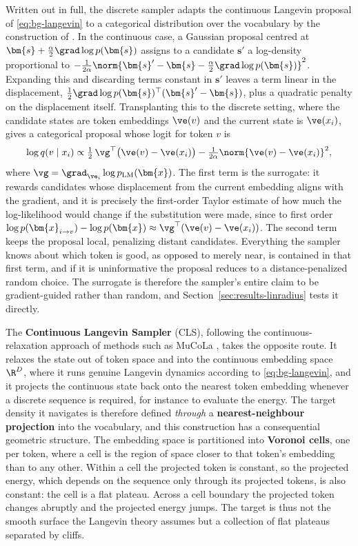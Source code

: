 Written out in full, the discrete sampler adapts the continuous Langevin proposal of \eqref{eq:bg-langevin} to a categorical distribution over the vocabulary by the construction of \citet{zhang2022langevin}. In the continuous case, a Gaussian proposal centred at $\bm{s} + \tfrac{\alpha}{2}\grad\log p(\bm{s})$ assigns to a candidate $\bm{s}'$ a log-density proportional to $-\tfrac{1}{2\alpha}\norm{\bm{s}' - \bm{s} - \tfrac{\alpha}{2}\grad\log p(\bm{s})}^2$. Expanding this and discarding terms constant in $\bm{s}'$ leaves a term linear in the displacement, $\tfrac{1}{2}\grad\log p(\bm{s})^\top(\bm{s}' - \bm{s})$, plus a quadratic penalty on the displacement itself. Transplanting this to the discrete setting, where the candidate states are token embeddings $\ve(v)$ and the current state is $\ve(x_i)$, gives a categorical proposal whose logit for token $v$ is
\begin{equation}
    \log q(v \mid x_i) \propto \tfrac{1}{2}\,\vg^\top\bigl(\ve(v) - \ve(x_i)\bigr) - \tfrac{1}{2\alpha}\norm{\ve(v) - \ve(x_i)}^2,
    \label{eq:bg-discrete-proposal}
\end{equation}
where $\vg = \grad_{\ve_i}\log p_{\text{LM}}(\bm{x})$. The first term is the surrogate: it rewards candidates whose displacement from the current embedding aligns with the gradient, and it is precisely the first-order Taylor estimate of how much the log-likelihood would change if the substitution were made, since to first order $\log p(\bm{x}_{i \to v}) - \log p(\bm{x}) \approx \vg^\top(\ve(v) - \ve(x_i))$. The second term keeps the proposal local, penalizing distant candidates. Everything the sampler knows about which token is good, as opposed to merely near, is contained in that first term, and if it is uninformative the proposal reduces to a distance-penalized random choice. The surrogate is therefore the sampler's entire claim to be gradient-guided rather than random, and Section~\ref{sec:results-linradius} tests it directly.

The \textbf{Continuous Langevin Sampler} (CLS), following the continuous-relaxation approach of methods such as MuCoLa \citep{kumar2022gradient}, takes the opposite route. It relaxes the state out of token space and into the continuous embedding space $\R^D$, where it runs genuine Langevin dynamics according to \eqref{eq:bg-langevin}, and it projects the continuous state back onto the nearest token embedding whenever a discrete sequence is required, for instance to evaluate the energy. The target density it navigates is therefore defined \emph{through} a \textbf{nearest-neighbour projection} into the vocabulary, and this construction has a consequential geometric structure. The embedding space is partitioned into \textbf{Voronoi cells}, one per token, where a cell is the region of space closer to that token's embedding than to any other. Within a cell the projected token is constant, so the projected energy, which depends on the sequence only through its projected tokens, is also constant: the cell is a flat plateau. Across a cell boundary the projected token changes abruptly and the projected energy jumps. The target is thus not the smooth surface the Langevin theory assumes but a collection of flat plateaus separated by cliffs.

